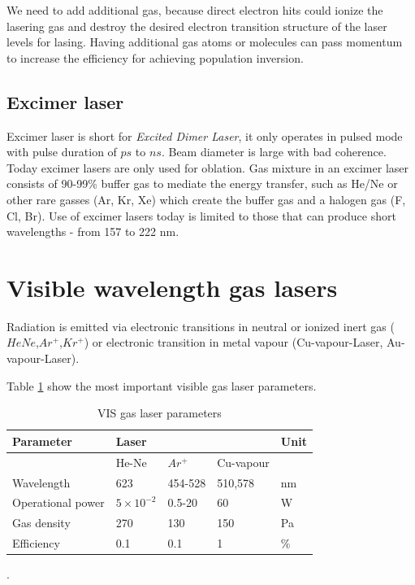We need to add additional gas, because direct electron hits could ionize the lasering gas and destroy the desired electron transition structure 
of the laser levels for lasing. Having additional gas atoms or molecules can pass momentum to increase the efficiency for achieving population inversion.

\subsection{Excimer laser}
Excimer laser is short for \textit{Excited Dimer Laser}, it only operates in pulsed mode with pulse duration of $ps$ to $ns$.
Beam diameter is large with bad coherence. Today excimer lasers are only used for oblation.
Gas mixture in an excimer laser consists of 90-99\% buffer gas to mediate the energy transfer, such as He/Ne or other rare gasses (Ar, Kr, Xe) which create the buffer gas and a halogen gas (F, Cl, Br).
Use of excimer lasers today is limited to those that can produce short wavelengths - from 157 to 222 nm.


\section{Visible wavelength gas lasers}
Radiation is emitted via electronic transitions in neutral or ionized inert gas ($HeNe$,$Ar^+$,$Kr^+$) or electronic transition
in metal vapour (Cu-vapour-Laser, Au-vapour-Laser).

Table \ref{tab:visgasl} show the most important visible gas laser parameters.

\begin{table}[h!]
    \centering
    \begin{tabular}{|l|l|l|l|l|}
    \hline
    Parameter         & \multicolumn{3}{l}{Laser}                & Unit \\
    \hline
                      & He-Ne              & $Ar^+$  & Cu-vapour &      \\
    \hline
    Wavelength         & 623                & 454-528 & 510,578   & nm   \\
    Operational power & $5 \times 10^{-2}$ & 0.5-20  & 60        & W    \\
    Gas density       & 270                & 130     & 150       & Pa   \\
    Efficiency        & 0.1                & 0.1     & 1         & \%  \\
    \hline
    \end{tabular}
    \caption{VIS gas laser parameters}.
    \label{tab:visgasl}
\end{table}

